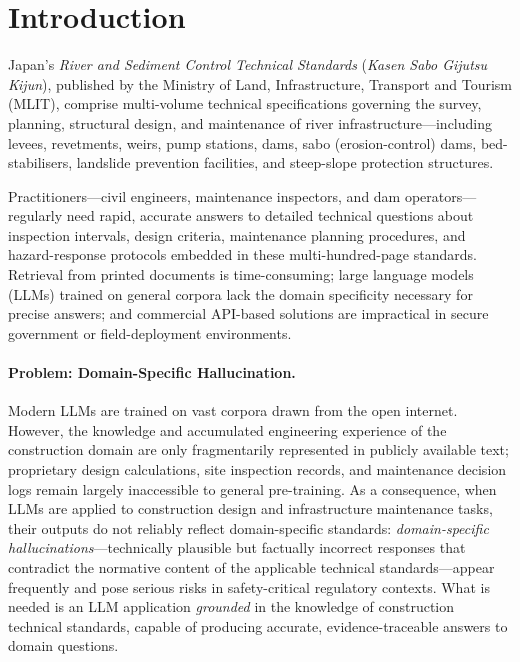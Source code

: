 \documentclass[twocolumn]{article}
\begin{document}
\section{Introduction}
\label{sec:intro}

Japan's \emph{River and Sediment Control Technical Standards} (\textit{Kasen Sabo Gijutsu Kijun}),
published by the Ministry of Land, Infrastructure, Transport and Tourism (MLIT),
comprise multi-volume technical specifications governing the survey, planning, structural design,
and maintenance of river infrastructure---including levees, revetments, weirs, pump stations,
dams, sabo (erosion-control) dams, bed-stabilisers, landslide prevention facilities, and
steep-slope protection structures.

Practitioners---civil engineers, maintenance inspectors, and dam operators---regularly need rapid,
accurate answers to detailed technical questions about inspection intervals, design criteria,
maintenance planning procedures, and hazard-response protocols embedded in these multi-hundred-page
standards.
Retrieval from printed documents is time-consuming; large language models (LLMs) trained on
general corpora lack the domain specificity necessary for precise answers;
and commercial API-based solutions are impractical in secure government or field-deployment
environments.

\paragraph{Problem: Domain-Specific Hallucination.}
Modern LLMs are trained on vast corpora drawn from the open internet.
However, the knowledge and accumulated engineering experience of the construction domain
are only fragmentarily represented in publicly available text;
proprietary design calculations, site inspection records, and maintenance decision logs
remain largely inaccessible to general pre-training.
As a consequence, when LLMs are applied to construction design and infrastructure maintenance tasks,
their outputs do not reliably reflect domain-specific standards:
\emph{domain-specific hallucinations}---technically plausible but factually incorrect responses
that contradict the normative content of the applicable technical standards---appear frequently
and pose serious risks in safety-critical regulatory contexts.
What is needed is an LLM application \emph{grounded} in the knowledge of construction technical
standards, capable of producing accurate, evidence-traceable answers to domain questions.
\end{document}
